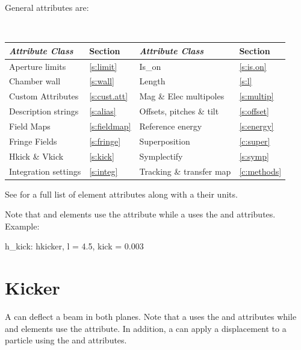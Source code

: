 General   attributes are:
\begin{center}
\tt
\begin{tabular}{llll} \toprule
  {\sl Attribute Class}      & Section           & {\sl Attribute Class}      & Section         \\ \midrule
  Aperture limits            & \ref{s:limit}     & Is_on                      & \ref{s:is.on}   \\
  Chamber wall               & \ref{s:wall}      & Length                     & \ref{s:l}       \\
  Custom Attributes          & \ref{s:cust.att}  & Mag \& Elec multipoles     & \ref{s:multip}  \\
  Description strings        & \ref{s:alias}     & Offsets, pitches \& tilt   & \ref{s:offset}  \\
  Field Maps                 & \ref{s:fieldmap}  & Reference energy           & \ref{s:energy}  \\ 
  Fringe Fields              & \ref{s:fringe}    & Superposition              & \ref{c:super}   \\
  Hkick \& Vkick             & \ref{s:kick}      & Symplectify                & \ref{s:symp}    \\
  Integration settings       & \ref{s:integ}     & Tracking \& transfer map   & \ref{c:methods} \\
  \bottomrule
\end{tabular}
\end{center}
\toffset
See  for a full list of element attributes along with a their units.

Note that  and  elements use the
 attribute while a  uses the  and  
attributes. Example:
\begin{example}
  h_kick: hkicker, l = 4.5, kick = 0.003
\end{example}

\newpage

\section{Kicker}
\label{s:kicker}

A  can deflect a beam in both planes. Note that a  uses the  and
 attributes while  and  elements use the  attribute.  In
addition, a  can apply a displacement to a particle using the  and
 attributes.

